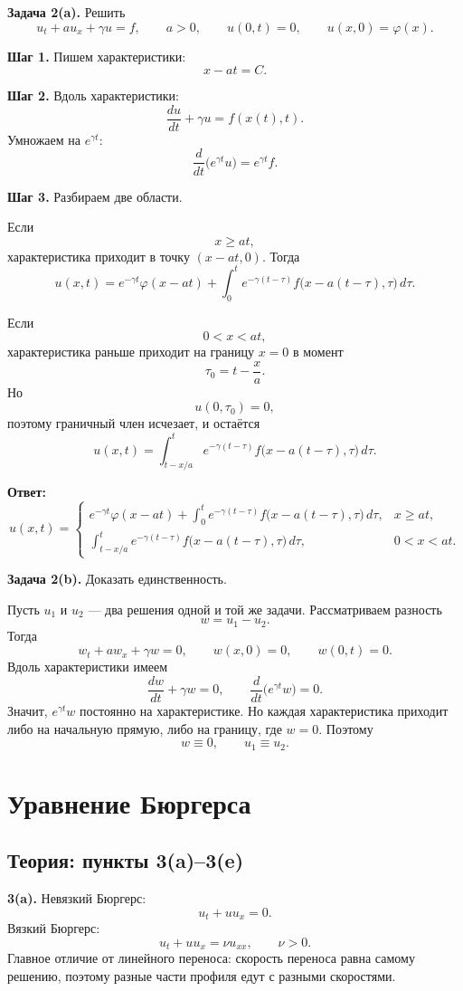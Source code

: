\documentclass[a4paper,12pt]{article}
\begin{document}
\textbf{Задача 2(a).} Решить
\[
u_t+a u_x+\gamma u=f,
\qquad a>0,
\qquad
u(0,t)=0,
\qquad
u(x,0)=\varphi(x).
\]

\textbf{Шаг 1.} Пишем характеристики:
\[
x-at=C.
\]

\textbf{Шаг 2.} Вдоль характеристики:
\[
\frac{du}{dt}+\gamma u=f(x(t),t).
\]
Умножаем на $e^{\gamma t}$:
\[
\frac{d}{dt}\bigl(e^{\gamma t}u\bigr)=e^{\gamma t}f.
\]

\textbf{Шаг 3.} Разбираем две области.

Если
\[
x\ge at,
\]
характеристика приходит в точку $(x-at,0)$. Тогда
\[
u(x,t)=e^{-\gamma t}\varphi(x-at)
+\int_0^t e^{-\gamma(t-\tau)}f\bigl(x-a(t-\tau),\tau\bigr)\,d\tau.
\]

Если
\[
0<x<at,
\]
характеристика раньше приходит на границу $x=0$ в момент
\[
\tau_0=t-\frac{x}{a}.
\]
Но
\[
u(0,\tau_0)=0,
\]
поэтому граничный член исчезает, и остаётся
\[
u(x,t)=\int_{t-x/a}^t e^{-\gamma(t-\tau)}f\bigl(x-a(t-\tau),\tau\bigr)\,d\tau.
\]

\textbf{Ответ:}
\[
u(x,t)=
\begin{cases}
\displaystyle
e^{-\gamma t}\varphi(x-at)
+\int_0^t e^{-\gamma(t-\tau)}f\bigl(x-a(t-\tau),\tau\bigr)\,d\tau,
& x\ge at,
\\[1.2em]
\displaystyle
\int_{t-x/a}^t e^{-\gamma(t-\tau)}f\bigl(x-a(t-\tau),\tau\bigr)\,d\tau,
& 0<x<at.
\end{cases}
\]

\textbf{Задача 2(b).} Доказать единственность.

Пусть $u_1$ и $u_2$ --- два решения одной и той же задачи. Рассматриваем разность
\[
w=u_1-u_2.
\]
Тогда
\[
w_t+a w_x+\gamma w=0,
\qquad
w(x,0)=0,
\qquad
w(0,t)=0.
\]
Вдоль характеристики имеем
\[
\frac{dw}{dt}+\gamma w=0,
\qquad
\frac{d}{dt}\bigl(e^{\gamma t}w\bigr)=0.
\]
Значит, $e^{\gamma t}w$ постоянно на характеристике. Но каждая характеристика приходит либо на начальную прямую, либо на границу, где $w=0$. Поэтому
\[
w\equiv 0,
\qquad
u_1\equiv u_2.
\]

\section{Уравнение Бюргерса}

\subsection{Теория: пункты 3(a)--3(e)}

\textbf{3(a).} Невязкий Бюргерс:
\[
u_t+u u_x=0.
\]
Вязкий Бюргерс:
\[
u_t+u u_x=\nu u_{xx},
\qquad \nu>0.
\]
Главное отличие от линейного переноса: скорость переноса равна самому решению, поэтому разные части профиля едут с разными скоростями.
\end{document}
